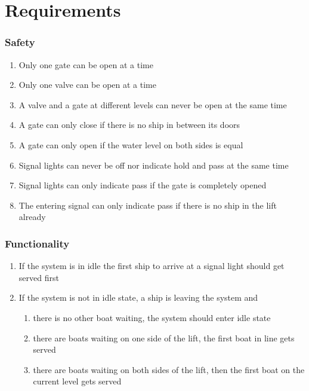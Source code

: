 \section{Requirements}
\subsubsection*{Safety}
\begin{enumerate}
	\item Only one gate can be open at a time
	\item Only one valve can be open at a time
	\item A valve and a gate at different levels can never be open at the same time
	\item A gate can only close if there is no ship in between its doors
	\item A gate can only open if the water level on both sides is equal
	\item Signal lights can never be off nor indicate hold and pass at the same time
	\item Signal lights can only indicate pass if the gate is completely opened
	\item The entering signal can only indicate pass if there is no ship in the lift already
\end{enumerate}

\subsubsection*{Functionality}
\begin{enumerate}
	\item If the system is in idle the first ship to arrive at a signal light should get served first
	\item If the system is not in idle state, a ship is leaving the system and
	\begin{enumerate}
		\item there is no other boat waiting, the system should enter idle state
		\item there are boats waiting on one side of the lift, the first boat in line gets served 
		\item there are boats waiting on both sides of the lift, then the first boat on the current level gets served
	\end{enumerate}
\end{enumerate}
